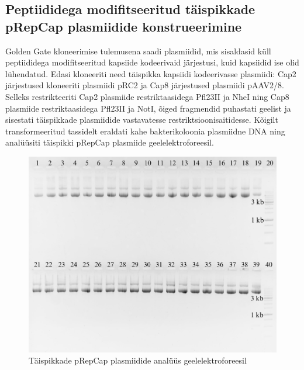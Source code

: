 \documentclass{trkut}%
\begin{document}
\subsection{Peptiididega modifitseeritud täispikkade pRepCap plasmiidide	konstrueerimine}

Golden Gate kloneerimise tulemusena saadi plasmiidid, mis sisaldasid küll peptiididega modifitseeritud kapsiide kodeerivaid järjestusi, kuid kapsiidid ise olid lühendatud. Edasi kloneeriti need täispikka kapsiidi kodeerivasse plasmiidi: Cap2 järjestused kloneeriti
plasmiidi pRC2 ja Cap8 järjestused plasmiidi pAAV2/8. Selleks restrikteeriti Cap2 plasmiide restriktaasidega Pfl23II ja NheI ning Cap8 plasmiide restriktaasidega Pfl23II ja NotI, õiged fragmendid puhastati geelist ja sisestati täispikkade plasmiidide vastavatesse restriktsioonisaitidesse. Kõigilt transformeeritud tassidelt eraldati kahe bakterikoloonia plasmiidne DNA ning analüüsiti täispikki pRepCap plasmiide geelelektroforeesil.


\begin{figure}[H]
	\includegraphics[width=14cm]{ggfull.png}
	\caption{Täispikkade pRepCap plasmiidide analüüs geelelektroforeesil}
	\label{ggfull}
\end{figure}
\end{document}
